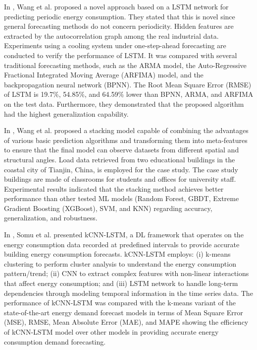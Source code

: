 In \cite{WANG2020117197}, Wang et al. proposed a novel approach based on a LSTM network for predicting periodic energy consumption.
They stated that this is novel since general forecasting methods do not concern periodicity.
Hidden features are extracted by the autocorrelation graph among the real industrial data.
Experiments using a cooling system under one-step-ahead forecasting are conducted to verify the performance of LSTM.
It was compared with several traditional forecasting methods, such as the ARMA model, the Auto-Regressive Fractional Integrated Moving Average (ARFIMA) model, and the backpropagation neural network (BPNN).
The Root Mean Square Error (RMSE) of LSTM is 19.7\%, 54.85\%, and 64.59\% lower than BPNN, ARMA, and ARFIMA on the test data.
Furthermore, they demonstrated that the proposed algorithm had the highest generalization capability.

In \cite{WANG2020114561}, Wang et al. proposed a stacking model capable of combining the advantages of various basic prediction algorithms and transforming them into meta-features to ensure that the final model can observe datasets from different spatial and structural angles.
Load data retrieved from two educational buildings in the coastal city of Tianjin, China, is employed for the case study.
The case study buildings are made of classrooms for students and offices for university staff.
Experimental results indicated that the stacking method achieves better performance than other tested ML models (Random Forest, GBDT, Extreme Gradient Boosting (XGBoost), SVM, and KNN) regarding accuracy, generalization, and robustness.

In \cite{SOMU2021110591}, Somu et al. presented kCNN-LSTM, a DL framework that operates on the energy consumption data recorded at predefined intervals to provide accurate building energy consumption forecasts.
kCNN-LSTM employs:
(i) k-means clustering to perform cluster analysis to understand the energy consumption pattern\slash trend;
(ii) CNN to extract complex features with non-linear interactions that affect energy consumption;
and (iii) LSTM network to handle long-term dependencies through modeling temporal information in the time series data.
The performance of kCNN-LSTM was compared with the k-means variant of the state-of-the-art energy demand forecast models in terms of Mean Square Error (MSE), RMSE, Mean Absolute Error (MAE), and MAPE showing the efficiency of kCNN-LSTM model over other models in providing accurate energy consumption demand forecasting.

